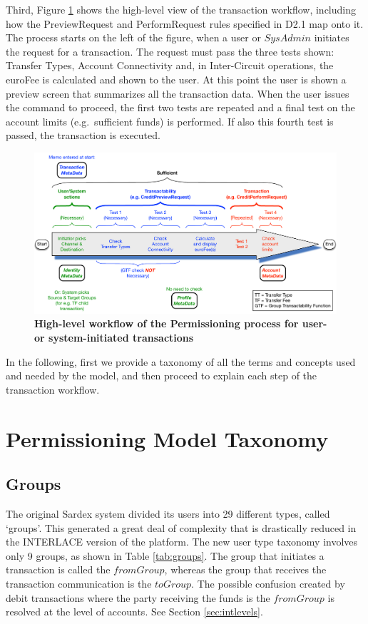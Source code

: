 Third, Figure \ref{fig:transactabilitywkflow} shows the high-level view of the transaction workflow, including how the PreviewRequest and PerformRequest rules specified in D2.1 map onto it. The process starts on the left of the figure, when a user or $SysAdmin$ initiates the request for a transaction. The request must pass the three tests shown: Transfer Types, Account Connectivity and, in Inter-Circuit operations, the euroFee is calculated and shown to the user. At this point the user is shown a preview screen that summarizes all the transaction data. When the user issues the command to proceed, the first two tests are repeated and a final test on the account limits (e.g.\ sufficient funds) is performed. If also this fourth test is passed, the transaction is executed.

\begin{figure}[h]
\centering
\includegraphics[width=17.5cm]{Figures/Transactability_Workflow}
\caption{\small\textbf{High-level workflow of the Permissioning process for user- or system-initiated transactions}}
\label{fig:transactabilitywkflow}
\end{figure}

In the following, first we provide a taxonomy of all the terms and concepts used and needed by the model, and then proceed to explain each step of the transaction workflow.


\section{Permissioning Model Taxonomy}
\subsection{Groups}
The original Sardex system divided its users into 29 different types, called `groups'. This generated a great deal of complexity that is drastically reduced in the INTERLACE version of the platform. The new user type taxonomy involves only 9 groups, as shown in Table \ref{tab:groups}. The group that initiates a transaction is called the $fromGroup$, whereas the group that receives the transaction communication is the $toGroup$. The possible confusion created by debit transactions where the party receiving the funds is the $fromGroup$ is resolved at the level of accounts. See Section \ref{sec:intlevels}.


